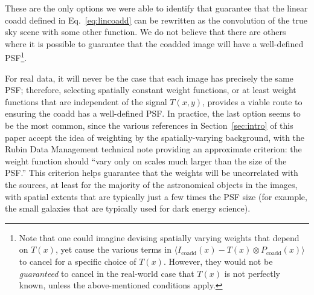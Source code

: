 \documentclass{openjournal}
\newcommand{\rachel}[1]{{\color{magenta}RM: #1}}
\newcommand{\mike}[1]{{\color{cyan}MJ: #1}}
\newcommand{\irresponse}[1]{{#1}}
\newcommand{\refresponse}[1]{#1}
\begin{document}
\begin{itemize}
\end{itemize}
These are the only options \irresponse{we were able to identify} that guarantee that the linear coadd defined in Eq.~\eqref{eq:lincoadd} can be rewritten as the convolution of the true sky scene with some other function. \irresponse{We do not believe that there are others where it is possible to} guarantee that the coadded image will have a well-defined PSF\footnote{\irresponse{Note that one could imagine devising spatially varying weights that depend on $T(x)$, yet cause the various terms in $\langle I_\text{coadd}(x)-T(x)\otimes P_\text{coadd}(x)\rangle$ to cancel for a specific choice of $T(x)$.  However, they would not be {\em guaranteed} to cancel in the real-world case that $T(x)$ is not perfectly known, unless the above-mentioned conditions apply.}}.


\irresponse{For real data,} it will never be the case that each image has precisely the same PSF; therefore, selecting spatially constant weight functions, or at least weight functions that are independent of the signal $T(x,y)$, provides a viable route to ensuring the coadd has a well-defined PSF.  
In practice, the last option seems to be the most common, since the various references in Section~\ref{sec:intro} of this paper accept the idea of weighting by the spatially-varying background, with the \irresponse{Rubin Data Management technical} note \refresponse{\citep{DMTN015}} providing an approximate criterion: the weight function should ``vary only on scales much larger than the size of the PSF.''  This criterion helps guarantee that the weights will be uncorrelated with the sources, at least for the majority of the astronomical objects in the images, with spatial extents that are typically just a few times the PSF size (for example, the small galaxies that are typically used for dark energy science).

\end{document}
